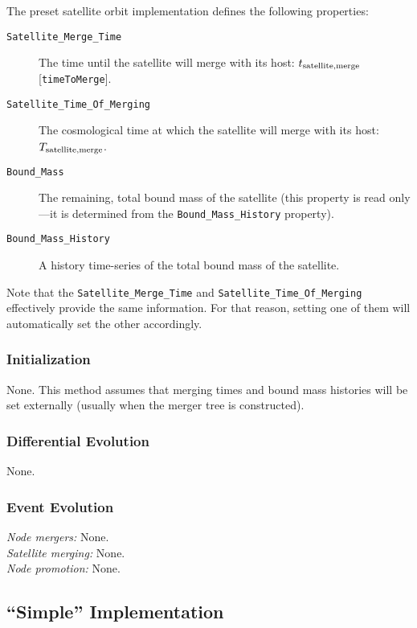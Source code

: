 The preset satellite orbit implementation defines the following properties:
\begin{description}
 \item [{\tt Satellite\_Merge\_Time}] The time until the satellite will merge with its host: $t_{\rm satellite, merge}$ [{\tt timeToMerge}].
 \item [{\tt Satellite\_Time\_Of\_Merging}] The cosmological time at which the satellite will merge with its host: $T_{\rm satellite, merge}$.
 \item [{\tt Bound\_Mass}] The remaining, total bound mass of the satellite (this property is read only---it is determined from the {\tt Bound\_Mass\_History} property).
 \item [{\tt Bound\_Mass\_History}] A history time-series of the total bound mass of the satellite.
\end{description}

Note that the {\tt Satellite\_Merge\_Time} and {\tt Satellite\_Time\_Of\_Merging} effectively provide the same information. For that reason, setting one of them will automatically set the other accordingly.

\subsubsection{Initialization}

None. This method assumes that merging times and bound mass histories will be set externally (usually when the merger tree is constructed).

\subsubsection{Differential Evolution}

None.

\subsubsection{Event Evolution}

\noindent\emph{Node mergers:} None.\\

\noindent\emph{Satellite merging:} None.\\

\noindent\emph{Node promotion:} None.\\

\subsection{``Simple'' Implementation}

